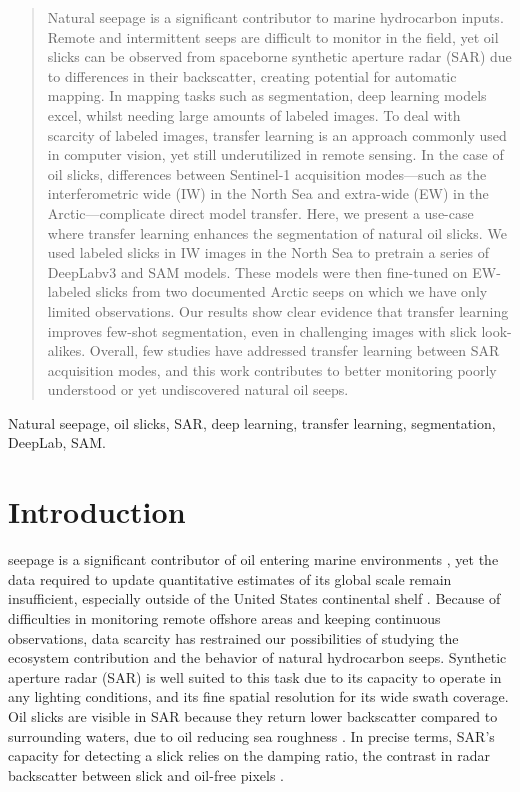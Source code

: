 \documentclass[lettersize,journal]{IEEEtran}
\begin{document}
\begin{abstract} 
    Natural seepage is a significant contributor to marine hydrocarbon inputs. Remote and intermittent seeps are difficult to monitor in the field, yet oil slicks can be observed from spaceborne 
    synthetic aperture radar (SAR) due to differences in their backscatter,
    creating potential for automatic mapping. In mapping tasks such as segmentation, deep learning models excel, whilst needing large amounts of labeled images.
    To deal with scarcity of labeled images, transfer learning is an approach 
    commonly used in computer vision, yet still underutilized in remote sensing. In the case of oil slicks, differences between Sentinel-1 acquisition modes—such as the 
    interferometric wide (IW) in the North Sea and extra-wide (EW) in the Arctic—complicate direct model transfer.
    Here, we present a use-case where transfer learning enhances the segmentation of natural oil slicks. We used labeled slicks in IW images in the North Sea to pretrain a series of DeepLabv3 and SAM models. 
    These models were then fine-tuned on EW-labeled slicks from two documented Arctic seeps on which we have only limited observations. Our results show clear evidence that transfer learning improves few-shot 
    segmentation, even in challenging images with slick look-alikes. Overall, few studies have addressed transfer learning between SAR acquisition modes, and this work contributes to 
    better monitoring poorly understood or yet undiscovered natural oil seeps. 
\end{abstract}

\begin{IEEEkeywords}
    Natural seepage, oil slicks, SAR, deep learning, transfer learning, segmentation, DeepLab, SAM.
\end{IEEEkeywords}

\section{Introduction}
 seepage is a significant contributor of oil entering marine environments \cite{kvenvoldenNaturalSeepageCrude2003}, yet the data required to update quantitative
estimates of its global scale remain insufficient, especially outside of the United States continental shelf \cite{nationalacademiesofsciencesengineeringandmedicineOilSeaIV2022}. Because of difficulties 
in monitoring remote offshore areas and keeping continuous observations, data scarcity has restrained our possibilities of studying the ecosystem contribution and the behavior of natural hydrocarbon seeps. 
Synthetic aperture radar (SAR) is well suited to this task due to its capacity to operate in any lighting conditions, and its fine spatial resolution for its wide swath coverage. 
Oil slicks are visible in SAR because they return lower backscatter compared to surrounding waters, due to oil reducing sea roughness \cite{brekkeSAROilSpill2020,fingasReviewOilSpill2018,alpersOilsSurfactants2004}.
In precise terms, SAR's capacity for detecting a slick relies on the damping ratio, the contrast in radar backscatter between slick and oil-free pixels \cite{hovlandSlickDetectionSAR1994,
quigleyInvestigationDampingRatio2023}.
\end{document}
